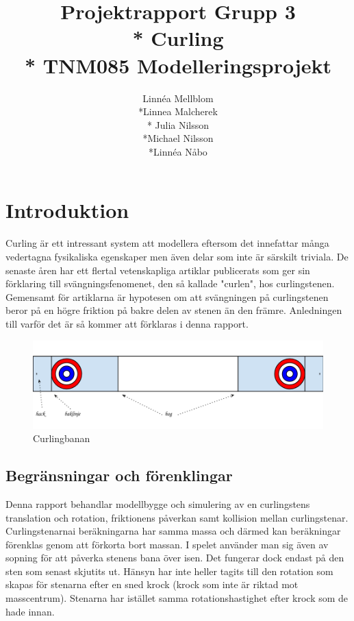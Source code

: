 \documentclass[11pt]{article} %
\title{Projektrapport Grupp 3 \\* 
Curling\\*
TNM085 Modelleringsprojekt}
\author{Linnéa Mellblom\\*Linnea Malcherek\\* Julia Nilsson\\*Michael Nilsson\\*Linnéa Nåbo}
\begin{document}
\maketitle
\pagebreak
{}  

\pagebreak
\tableofcontents
\pagebreak

\section{Introduktion}
Curling är ett intressant system att modellera eftersom det innefattar många vedertagna fysikaliska egenskaper men även delar som inte är särskilt triviala. 
De senaste åren har ett flertal vetenskapliga artiklar publicerats som ger sin förklaring till svängningsfenomenet, den så kallade "curlen", hos curlingstenen.
Gemensamt för artiklarna är hypotesen om att svängningen på curlingstenen beror på en högre friktion på bakre delen av stenen än den främre. 
Anledningen till varför det är så kommer att förklaras i denna rapport.

\begin{figure}[ht!]
\centering
\includegraphics[width=140mm]{bana.png}
\caption{Curlingbanan}
\label{fig:bana}
\label{overflow}
\end{figure}

\subsection{Begränsningar och förenklingar} 
Denna rapport behandlar modellbygge och simulering av en curlingstens translation
och rotation, friktionens påverkan samt kollision mellan curlingstenar. 
Curlingstenarnai beräkningarna har samma massa och därmed kan beräkningar förenklas genom att
förkorta bort massan. I spelet använder man sig även av sopning för att påverka stenens
bana över isen. Det fungerar dock endast på den sten som senast skjutits ut. Hänsyn har
inte heller tagits till den rotation som skapas för stenarna efter en sned krock (krock som
inte är riktad mot masscentrum). Stenarna har istället samma rotationshastighet efter
krock som de hade innan.
\end{document}

